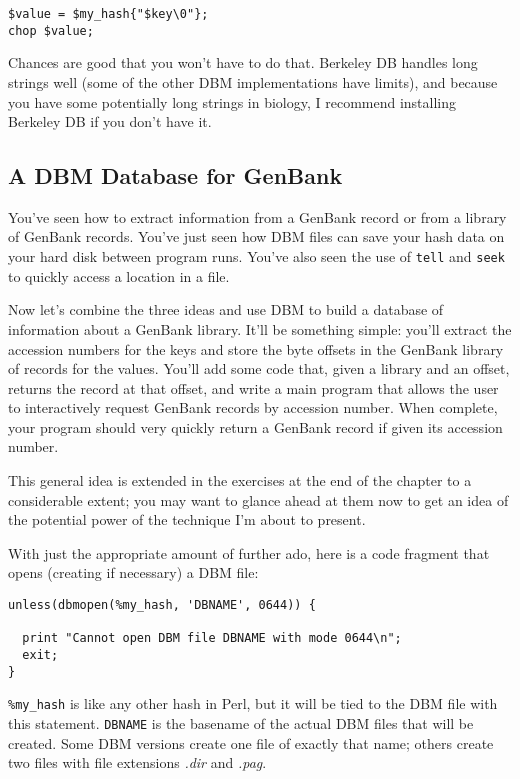 \begin{lstlisting}
$value = $my_hash{"$key\0"};
chop $value;
\end{lstlisting}

Chances are good that you won't have to do that. Berkeley DB handles long strings well (some of the other DBM implementations have limits), and because you have some potentially long strings in biology, I recommend installing Berkeley DB if you don't have it.

\subsection{A DBM Database for GenBank}
You've seen how to extract information from a GenBank record or from a library of GenBank records. You've just seen how DBM files can save your hash data on your hard disk between program runs. You've also seen the use of \verb|tell| and \verb|seek| to quickly access a location in a file.

Now let's combine the three ideas and use DBM to build a database of information about a GenBank library. It'll be something simple: you'll extract the accession numbers for the keys and store the byte offsets in the GenBank library of records for the values. You'll add some code that, given a library and an offset, returns the record at that offset, and write a main program that allows the user to interactively request GenBank records by accession number. When complete, your program should very quickly return a GenBank record if given its accession number.

This general idea is extended in the exercises at the end of the chapter to a considerable extent; you may want to glance ahead at them now to get an idea of the potential power of the technique I'm about to present.

With just the appropriate amount of further ado, here is a code fragment that opens (creating if necessary) a DBM file:

\begin{lstlisting}
unless(dbmopen(%my_hash, 'DBNAME', 0644)) {
  
  print "Cannot open DBM file DBNAME with mode 0644\n";
  exit;
}
\end{lstlisting}

\verb|%my_hash| is like any other hash in Perl, but it will be tied to the DBM file with this statement. \verb|DBNAME| is the basename of the actual DBM files that will be created. Some DBM versions create one file of exactly that name; others create two files with file extensions \textit{.dir} and \textit{.pag}.

